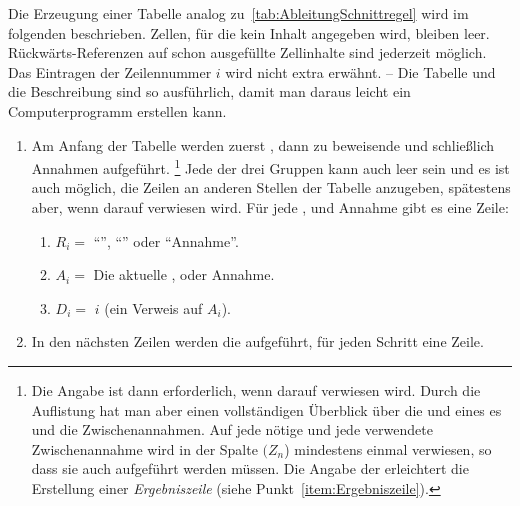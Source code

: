 {Die Erzeugung einer Tabelle analog zu~\vref{tab:AbleitungSchnittregel} wird im folgenden beschrieben.
Zellen, für die kein Inhalt angegeben wird, bleiben leer.
Rückwärts-Referenzen auf schon ausgefüllte Zellinhalte sind jederzeit möglich.
Das Eintragen der Zeilennummer $i$ wird nicht extra erwähnt.
-- Die Tabelle und die Beschreibung sind so ausführlich, damit man daraus leicht ein Computerprogramm erstellen kann.
%
\begin{enumerate}
	\item Am Anfang der Tabelle werden zuerst , dann zu beweisende  und schließlich Annahmen aufgeführt.%
	\footnote{%
		Die Angabe ist dann erforderlich, wenn darauf verwiesen wird.
		Durch die Auflistung hat man aber einen vollständigen Überblick über die  und  eines es und die Zwischenannahmen.
		Auf jede nötige  und jede verwendete Zwischenannahme wird in der Spalte $(Z_n$) mindestens einmal verwiesen, so dass sie auch aufgeführt werden müssen.
		Die Angabe der  erleichtert die Erstellung einer \emph{Ergebniszeile} (siehe Punkt~\ref{item:Ergebniszeile}).
	}
	Jede der drei Gruppen kann auch leer sein und es ist auch möglich, die Zeilen an anderen Stellen der Tabelle anzugeben, spätestens aber, wenn darauf verwiesen wird.
	Für jede ,  und Annahme gibt es eine Zeile:
	\begin{enumerate}
		\item $R_i =$ \enquote{}, \enquote{} oder \enquote{Annahme}.
		\item $A_i =$ Die aktuelle ,  oder Annahme.
		\item $D_i =$ $i$ \quad (ein Verweis auf $A_i$).
	\end{enumerate}
	\item In den nächsten Zeilen werden die  aufgeführt, für jeden Schritt eine Zeile.


\end{enumerate}}
